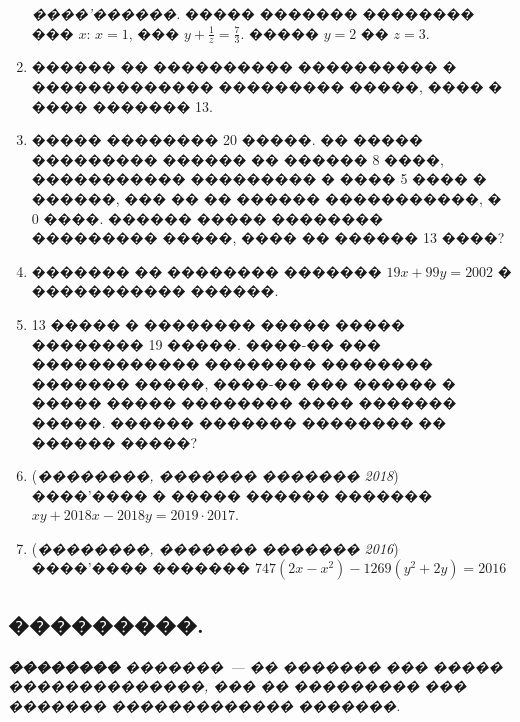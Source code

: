 \documentclass[a4paper,12pt]{article}
\begin{document}
\begin{enumerate}
\textit{����'������.} ����� ������� �������� ��� $x$: $x=1$, ��� $y+\frac{1}{z}=\frac{7}{3}$. ����� $y=2$ �� $z=3$.

\item ������ �� ���������� ���������� � ������������� ���������
�����, ���� � ���� ������� 13.

\item ����� �������� 20 �����. �� ����� ��������� ������ �� ������ 8 ����,
����������� ��������� � ���� 5 ���� � ������, ��� �� �� ������ �����������, � 0 ����.
������ ����� �������� ��������� �����, ���� �� ������ 13 ����?

\item ������� �� �������� ������� $19x+99y = 2002$ � ����������� ������.

\item 13 ����� � �������� ����� ����� �������� 19 �����. ����-�� ��� ������������ �������� �������� ������� �����, ����-�� ��� ������ � ����� ����� �������� ���� ������� �����. ������ ������� �������� �� ������ �����?

\item (\textit{��������, ������� ������� 2018}) ����'���� � ����� ������ ������� $xy+2018x-2018y=2019\cdot 2017.$

\item (\textit{��������, ������� ������� 2016}) ����'���� ������� $747(2x-x^{2})-1269(y^{2}+2y)=2016$
\end{enumerate}











\newpage

\begin{center}
\section*{���������.}
\end{center}

\textit{\textbf{��������} �������~--- �� ������� ��� ����� ��������������, ��� �� ��������� ��� ������� ������������� �������.}

\medskip\medskip\medskip
\end{document}
